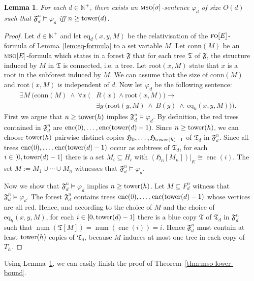 \documentclass[11pt]{article}
\newtheorem{lemma}[theorem]{Lemma}
\renewcommand{\phi}{\varphi}
\newcommand{\tower}{\textup{tower}}
\newcommand{\conn}{\text{conn}}
\newcommand{\logic}[1]{\textsc{#1}}
\newcommand{\FO}{\logic{fo}}
\newcommand{\MSO}{\logic{mso}}
\newcommand{\limplies}{\rightarrow}
\newcommand{\rela}[2]{\ensuremath{{#1|}_{#2}}}
\newcommand{\struct}[1]{\mathfrak{#1}}
\newcommand{\FS}{\struct{F}}
\newcommand{\HS}{\struct{H}}
\newcommand{\TS}{\struct{T}}
\newcommand{\iso}{\cong}
\newcommand{\num}{\operatorname{num}}
\newcommand{\Npos}{\mathbb{N}^{+}}
\newcommand{\union}{\cup}
\newcommand{\bigo}{O}
\newcommand{\enc}{\operatorname{enc}} \newcommand{\inc}{\textsc{inc}}
\begin{document}
\begin{lemma}
  \label{lem:mso-lower-bound-main-lemma}
  For each $d\in \Npos$, there exists an $\MSO[\sigma]$-sentence
  $\phi_d$ of size $\bigo(d)$ such that $\FS_d^n \models \phi_d$ iff $n
  \geq \tower(d)$.
\end{lemma}
\begin{proof}
  Let $d\in \Npos$ and let $\text{eq}_d(x,y,M)$ be the
  relativisation of the $\FO[E]$-formula of Lemma~\ref{lem:eq-formula}
  to a set variable $M$. Let $\text{conn}(M)$ be an $\MSO[E]$-formula
  which states in a forest $\FS$ that for each tree $\TS$ of $\FS$,
  the structure induced by $M$ in $\TS$ is connected, i.e. a tree.
  Let $\text{root}(x,M)$ state that $x$ is a root in the
  subforest induced by $M$.
  We can assume that the size of $\text{conn}(M)$ and $\text{root}(x,M)$ is independent
  of $d$.
  Now let $\phi_d$ be the following sentence:
  \begin{align*}
    \exists M\ \Big(\conn(M) \ \land \ \forall x\ \big(&R(x) \land \text{root}(x,M)\big)  \limplies\\
    &\exists y\ \big(\text{root}(y,M) \ \land \ B(y) \ \land \
    \text{eq}_h(x,y,M)\big)\Big).
  \end{align*}
  First we argue that $n \geq \tower(h)$ implies $\FS^n_d\models \phi_d$.
  By definition, the red trees contained in $\FS_d^n$ are $\enc(0),
  \ldots, \enc(\tower(d)-1)$. Since $n\geq \tower(h)$, we can choose
  $\tower(h)$ pairwise distinct copies $\HS_0, \ldots, \HS_{\tower(h)-1}$ of $\TS_d$
  in $\FS_d^n$. Since all trees $\enc(0), \ldots, \enc(\tower(d)-1)$
  occur as subtrees of $\TS_d$, for each $i\in [0,\tower(d)-1]$
  there is a set $M_i\subseteq H_i$ with $\rela{(\HS_n[M_n])}{E}\iso
  \enc(i)$.  The set $M:=M_1 \union \dotsb \union M_n$ witnesses that $\FS_d^n\models
  \phi_d$.
  
  Now we show that $\FS_d^n\models \phi_d$ implies $n \geq \tower(h)$.
  Let $M\subseteq F_d^n$ witness that
  $\FS_d^n\models \phi_d$. The forest $\FS_d^n$ contains trees
  $\enc(0),\ldots,\enc(\tower(d)-1)$ whose vertices are all red. Hence, and according to the
  choice of $M$ and the choice of $\text{eq}_h(x,y,M)$, for
  each $i\in [0,\tower(d)-1]$ there is a
  blue copy $\TS$ of $\TS_d$ in $\FS_d^n$ such that
  $\num(\TS[M])=\num(\enc(i))=i$. Hence $\FS_d^n$ must contain at least
  $\tower(h)$ copies of $\TS_d$, because $M$ induces at most one tree in
  each copy of $T_h$.
\end{proof}

Using Lemma~\ref{lem:mso-lower-bound-main-lemma}, we can easily finish the proof
of Theorem~\ref{thm:mso-lower-bound}.
\end{document}
